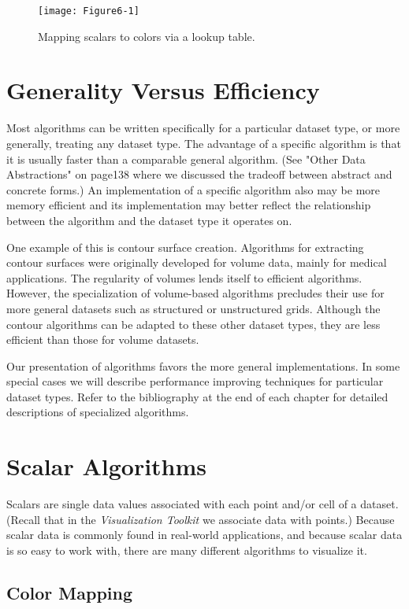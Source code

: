 \begin{figure}[!htb]
	\centering
	\texttt{[image: Figure6-1]}\\
	\caption{Mapping scalars to colors via a lookup table.}\label{fig:Figure6-1}
\end{figure}

\section{Generality Versus Efficiency}
Most algorithms can be written specifically for a particular dataset type, or more generally, treating any dataset type. The advantage of a specific algorithm is that it is usually faster than a comparable general algorithm. (See "Other Data Abstractions" on page138 where we discussed the tradeoff between abstract and concrete forms.) An implementation of a specific algorithm also may be more memory efficient and its implementation may better reflect the relationship between the algorithm and the dataset type it operates on.

One example of this is contour surface creation. Algorithms for extracting contour surfaces were originally developed for volume data, mainly for medical applications. The regularity of volumes lends itself to efficient algorithms. However, the specialization of volume-based algorithms precludes their use for more general datasets such as structured or unstructured grids. Although the contour algorithms can be adapted to these other dataset types, they are less efficient than those for volume datasets.

Our presentation of algorithms favors the more general implementations. In some special cases we will describe performance improving techniques for particular dataset types. Refer to the bibliography at the end of each chapter for detailed descriptions of specialized algorithms.

\section{Scalar Algorithms}

Scalars are single data values associated with each point and/or cell of a dataset. (Recall that in the \emph{Visualization Toolkit} we associate data with points.) Because scalar data is commonly found in real-world applications, and because scalar data is so easy to work with, there are many different algorithms to visualize it.

\subsection{Color Mapping}

